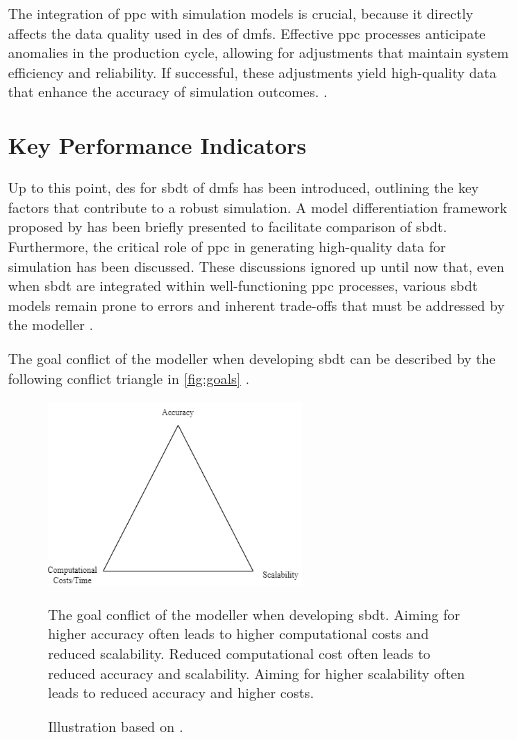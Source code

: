 The integration of \gls{ppc} with simulation models is crucial, because it directly affects the data quality used in \gls{des} of \gls{dmfs}. Effective \gls{ppc} processes anticipate anomalies in the production cycle, allowing for adjustments that maintain system efficiency and reliability. If successful, these adjustments yield high-quality data that enhance the accuracy of simulation outcomes. \autocite{kiran2019production}.


\subsection{Key Performance Indicators}
\label{sec:relevant-kpis}
Up to this point, \gls{des} for \gls{sbdt} of \gls{dmfs} has been introduced, outlining the key factors that contribute to a robust simulation. A model differentiation framework proposed by \textcite*{schwede2024learning} has been briefly presented to facilitate comparison of \gls{sbdt}. Furthermore, the critical role of \gls{ppc} in generating high-quality data for simulation has been discussed. These discussions ignored up until now that, even when \gls{sbdt} are integrated within well-functioning \gls{ppc} processes, various \gls{sbdt} models remain prone to errors and inherent trade-offs that must be addressed by the modeller \autocite{Tao2018ijamt}.

The goal conflict of the modeller when developing \gls{sbdt} can be described by the following conflict triangle in \autoref{fig:goals} \autocite{robinson2014simulation,balci2012life}.

\begin{figure}[htbp]
  \centering
  \includegraphics[width=0.6\textwidth]{figures/goals.png}
  \caption[Conflict Triangle]{The goal conflict of the modeller when developing \gls{sbdt}. Aiming for higher accuracy often leads to higher computational costs and reduced scalability. Reduced computational cost often leads to reduced accuracy and scalability. Aiming for higher scalability often leads to reduced accuracy and  higher costs.}
  \label{fig:goals}
  \caption*{Illustration based on \autocite{robinson2014simulation,balci2012life}.}
\end{figure}

